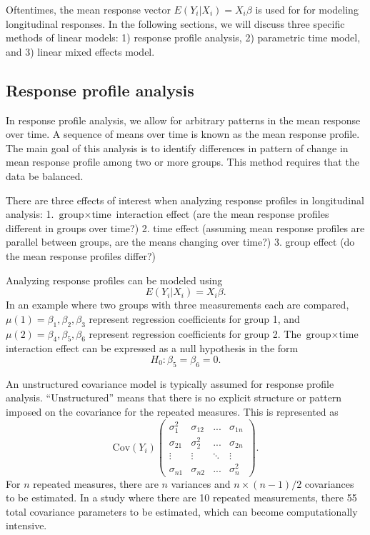 \documentclass[12pt, twoside]{amherstthesis}
\begin{document}
Oftentimes, the mean response vector \(E(Y_i|X_i) = X_i\beta\) is used for for modeling longitudinal responses. In the following sections, we will discuss three specific methods of linear models: 1) response profile analysis, 2) parametric time model, and 3) linear mixed effects model.

\hypertarget{response-profile-analysis}{%
\subsection{Response profile analysis}\label{response-profile-analysis}}

In response profile analysis, we allow for arbitrary patterns in the mean response over time. A sequence of means over time is known as the mean response profile. The main goal of this analysis is to identify differences in pattern of change in mean response profile among two or more groups. This method requires that the data be balanced.

There are three effects of interest when analyzing response profiles in longitudinal analysis:
1. \(\text{group} \times \text{time}\) interaction effect (are the mean response profiles different in groups over time?)
2. time effect (assuming mean response profiles are parallel between groups, are the means changing over time?)
3. group effect (do the mean response profiles differ?)

Analyzing response profiles can be modeled using \[E(Y_i|X_i) = X_i\beta.\] In an example where two groups with three measurements each are compared, \(\mu(1) = \beta_1,\beta_2,\beta_3\) represent regression coefficients for group 1, and \(\mu(2) = \beta_4,\beta_5,\beta_6\) represent regression coefficients for group 2. The \(\text{group} \times \text{time}\) interaction effect can be expressed as a null hypothesis in the form \[H_0: \beta_5 =\beta_6=0.\]

An unstructured covariance model is typically assumed for response profile analysis. ``Unstructured'' means that there is no explicit structure or pattern imposed on the covariance for the repeated measures. This is represented as \[\text{Cov}(Y_i) \begin{pmatrix} \sigma_1^2 &\sigma_{12} & ...& \sigma_{1n} \\ \sigma_{21} &\sigma_2^2 & ... & \sigma_{2n} \\ \vdots & \vdots & \ddots & \vdots \\ \sigma_{n1} & \sigma_{n2} & ... & \sigma_n^2\end{pmatrix}.\] For \(n\) repeated measures, there are \(n\) variances and \(n \times (n-1)/2\) covariances to be estimated. In a study where there are 10 repeated measurements, there 55 total covariance parameters to be estimated, which can become computationally intensive.
\end{document}
